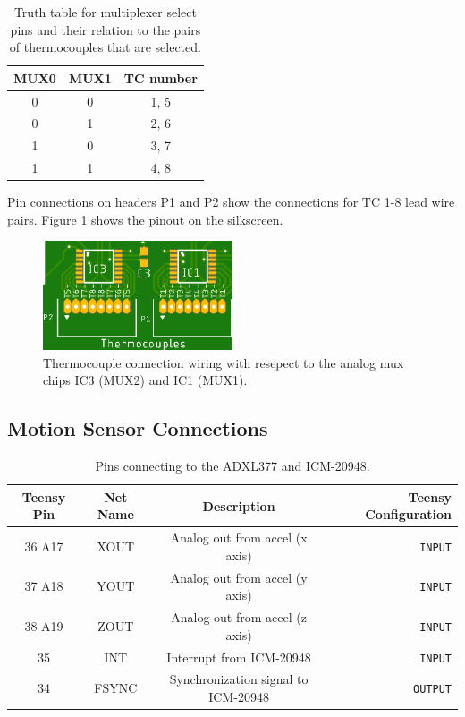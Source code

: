 \documentclass{article}
\begin{document}
\begin{table}[H]
  \centering
  \begin{tabular}{c | c | c}
    MUX0 & MUX1 & TC number \\
    \hline
    0 & 0 & 1, 5 \\
    0 & 1 & 2, 6 \\
    1 & 0 & 3, 7 \\
    1 & 1 & 4, 8
  \end{tabular}
  \caption{Truth table for multiplexer select pins and their relation to the pairs of thermocouples that are selected.}
  \label{tab:tc-mux-sel}
\end{table}
%
Pin connections on headers P1 and P2 show the connections for TC 1-8 lead wire pairs. Figure \ref{fig:tc-conn} shows the pinout on the silkscreen.
%
\begin{figure}[H]
    \centering
    \includegraphics[width=0.5\textwidth]{images/krepe-thermocouples.png}
    \caption{Thermocouple connection wiring with resepect to the analog mux chips IC3 (MUX2) and IC1 (MUX1).}
    \label{fig:tc-conn}
\end{figure}




\subsection{Motion Sensor Connections}

\begin{table}[H]
    \centering
    \begin{tabular}{c|c|c|r}
    Teensy Pin & Net Name  & Description   & Teensy Configuration \\
    \hline 
    36 A17 & XOUT & Analog out from accel (x axis) & \texttt{INPUT} \\
    37 A18 & YOUT & Analog out from accel (y axis) & \texttt{INPUT} \\
    38 A19 & ZOUT & Analog out from accel (z axis) & \texttt{INPUT} \\
    35 & INT & Interrupt from ICM-20948 & \texttt{INPUT} \\
    34 & FSYNC & Synchronization signal to ICM-20948 & \texttt{OUTPUT} 
    \end{tabular}
    \caption{Pins connecting to the ADXL377 and ICM-20948.}
    \label{tab:pins_motionsensor}
\end{table}
\end{document}
